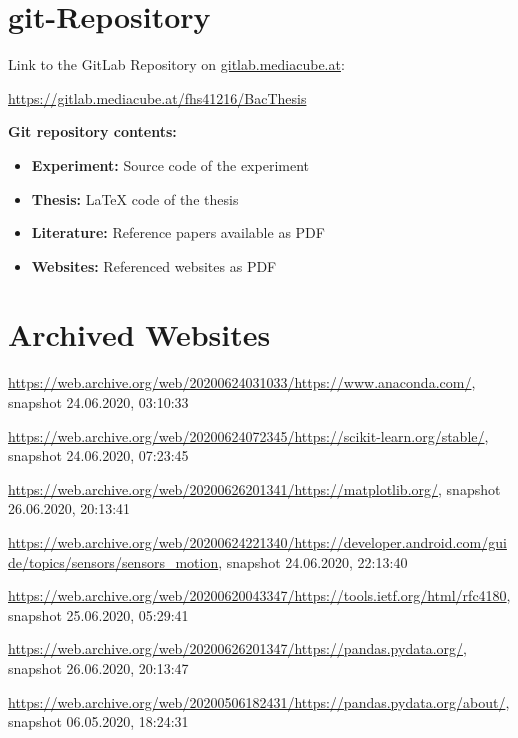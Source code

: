 \begin{appendices}

\section{git-Repository}



Link to the GitLab Repository on {\url{gitlab.mediacube.at}}:

{\color{red}\url{https://gitlab.mediacube.at/fhs41216/BacThesis}}

\textbf{Git repository contents:}

\begin{itemize}
	\item \textbf{Experiment:} Source code of the experiment
	\item \textbf{Thesis:} LaTeX code of the thesis
	\item \textbf{Literature:} Reference papers available as PDF
	\item \textbf{Websites:} Referenced websites as PDF
\end{itemize}



\section{Archived Websites}
\label{appendix:archivedWebsites}
\sloppy
\url{https://web.archive.org/web/20200624031033/https://www.anaconda.com/}, snapshot 24.06.2020, 03:10:33

\url{https://web.archive.org/web/20200624072345/https://scikit-learn.org/stable/}, snapshot 24.06.2020, 07:23:45

\url{https://web.archive.org/web/20200626201341/https://matplotlib.org/}, snapshot 26.06.2020, 20:13:41

\url{https://web.archive.org/web/20200624221340/https://developer.android.com/guide/topics/sensors/sensors_motion}, snapshot 24.06.2020, 22:13:40

\url{https://web.archive.org/web/20200620043347/https://tools.ietf.org/html/rfc4180}, snapshot 25.06.2020, 05:29:41

\url{https://web.archive.org/web/20200626201347/https://pandas.pydata.org/}, snapshot 26.06.2020, 20:13:47

\url{https://web.archive.org/web/20200506182431/https://pandas.pydata.org/about/}, snapshot 06.05.2020, 18:24:31


\end{appendices}
